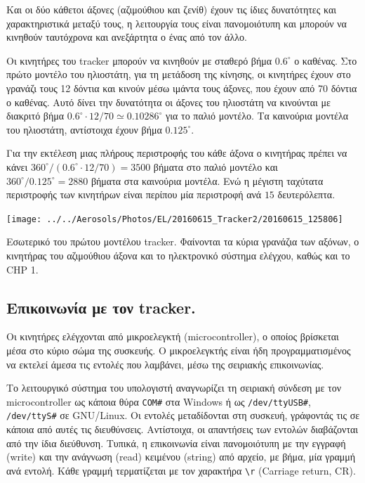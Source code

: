 \documentclass[
  a4paper,
  twoside,
  titlepage,
  11pt]{article}
\numberwithin{equation}{section}
\numberwithin{figure}{section}
\numberwithin{table}{section}
\begin{document}
Και οι δύο κάθετοι άξονες (αζιμούθιου και ζενίθ) έχουν τις ίδιες δυνατότητες και
χαρακτηριστικά μεταξύ τους, η λειτουργία τους είναι πανομοιότυπη και μπορούν να
κινηθούν ταυτόχρονα και ανεξάρτητα ο ένας από τον άλλο.

Οι κινητήρες του tracker μπορούν να κινηθούν με σταθερό βήμα \(0.6^\circ\) ο καθένας.
Στο πρώτο μοντέλο του ηλιοστάτη, για τη μετάδοση της κίνησης, οι κινητήρες έχουν στο
γρανάζι τους 12 δόντια και κινούν μέσω ιμάντα τους άξονες, που έχουν από 70 δόντια ο
καθένας. Αυτό δίνει την δυνατότητα οι άξονες του ηλιοστάτη να κινούνται με διακριτό
βήμα \(0.6^\circ \cdot 12 / 70 \simeq 0.10286^\circ\) για το παλιό μοντέλο. Τα
καινούρια μοντέλα του ηλιοστάτη, αντίστοιχα έχουν βήμα \({0.125}^\circ\).

Για την εκτέλεση μιας πλήρους περιστροφής του κάθε άξονα ο κινητήρας πρέπει να κάνει
\(360^\circ / (0.6^\circ \cdot 12 / 70) = 3500\) βήματα στο παλιό μοντέλο και
\(360^\circ / {0.125}^\circ = 2880\) βήματα στα καινούρια μοντέλα. Ενώ η μέγιστη
ταχύτατα περιστροφής των κινητήρων είναι περίπου μία περιστροφή ανά \(15\)
δευτερόλεπτα.

\begin{img}

{\centering \texttt{[image: ../../Aerosols/Photos/EL/20160615\_Tracker2/20160615\_125806]} 

}

\caption{Εσωτερικό του πρώτου μοντέλου tracker. Φαίνονται τα κύρια γρανάζια των αξόνων, ο κινητήρας του αζιμούθιου άξονα και το ηλεκτρονικό σύστημα ελέγχου, καθώς και το CHP 1.}\label{fig:trackerinside}
\end{img}

\hypertarget{tracker_communication}{%
\subsection{Επικοινωνία με τον tracker.}\label{tracker_communication}}

Οι κινητήρες ελέγχονται από μικροελεγκτή (microcontroller), ο οποίος βρίσκεται μέσα
στο κύριο σώμα της συσκευής. Ο μικροελεγκτής είναι ήδη προγραμματισμένος να εκτελεί
άμεσα τις εντολές που λαμβάνει, μέσω της σειριακής επικοινωνίας.

Το λειτουργικό σύστημα του υπολογιστή αναγνωρίζει τη σειριακή σύνδεση με τον
microcontroller ως κάποια θύρα \texttt{COM\#} στα Windows ή ως \texttt{/dev/ttyUSB\#}, \texttt{/dev/ttyS\#}
σε GNU/Linux. Οι εντολές μεταδίδονται στη συσκευή, γράφοντάς τις σε κάποια από αυτές
τις διευθύνσεις. Αντίστοιχα, οι απαντήσεις των εντολών διαβάζονται από την ίδια
διεύθυνση. Τυπικά, η επικοινωνία είναι πανομοιότυπη με την εγγραφή (write) και την
ανάγνωση (read) κειμένου (string) από αρχείο, με βήμα, μία γραμμή ανά εντολή. Κάθε
γραμμή τερματίζεται με τον χαρακτήρα \texttt{\textquotesingle{}\textbackslash{}r\textquotesingle{}} (Carriage return, CR).
\end{document}
